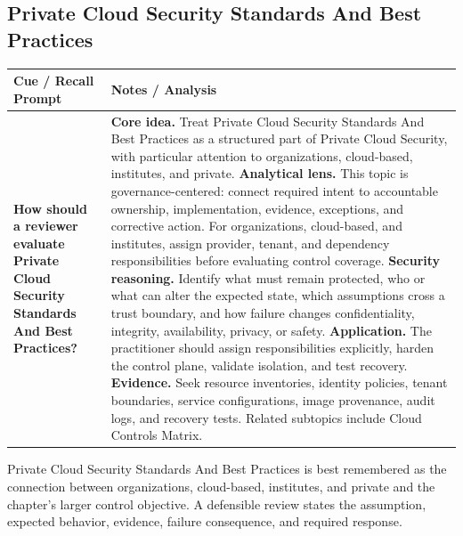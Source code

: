 \documentclass[11pt]{article}
\newcommand{\CornellHeader}{%
\rowcolor{Navy}\color{white}\bfseries Cue / Recall Prompt & \color{white}\bfseries Notes / Analysis\\\hline}
\newcommand{\CornellRow}[2]{%
\cellcolor{CueGray}\RaggedRight\textbf{#1} & \RaggedRight #2\\\hline}
\begin{document}
\subsection*{Private Cloud Security Standards And Best Practices}
\begin{longtable}{>{\RaggedRight\arraybackslash}p{}|>{\RaggedRight\arraybackslash}p{}}
\CornellHeader
\CornellRow{How should a reviewer evaluate Private Cloud Security Standards And Best Practices?}{\textbf{Core idea.} Treat Private Cloud Security Standards And Best Practices as a structured part of Private Cloud Security, with particular attention to organizations, cloud-based, institutes, and private. \textbf{Analytical lens.} This topic is governance-centered: connect required intent to accountable ownership, implementation, evidence, exceptions, and corrective action. For organizations, cloud-based, and institutes, assign provider, tenant, and dependency responsibilities before evaluating control coverage. \textbf{Security reasoning.} Identify what must remain protected, who or what can alter the expected state, which assumptions cross a trust boundary, and how failure changes confidentiality, integrity, availability, privacy, or safety. \textbf{Application.} The practitioner should assign responsibilities explicitly, harden the control plane, validate isolation, and test recovery. \textbf{Evidence.} Seek resource inventories, identity policies, tenant boundaries, service configurations, image provenance, audit logs, and recovery tests. Related subtopics include Cloud Controls Matrix.}
\end{longtable}
\begin{topicsummary}
Private Cloud Security Standards And Best Practices is best remembered as the connection between organizations, cloud-based, institutes, and private and the chapter's larger control objective. A defensible review states the assumption, expected behavior, evidence, failure consequence, and required response.
\end{topicsummary}
\end{document}

